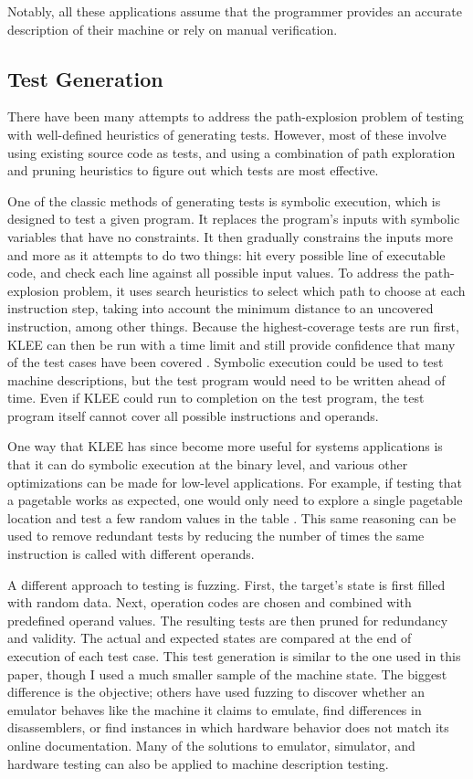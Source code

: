\documentclass[letterpaper,12pt]{article}
\begin{document}
Notably, all these applications assume that the programmer provides an accurate description of their machine or rely on manual verification.

\subsection{Test Generation}

There have been many attempts to address the path-explosion problem of testing with well-defined heuristics of generating tests. However, most of these involve using existing source code as tests, and using a combination of path exploration and pruning heuristics to figure out which tests are most effective.

One of the classic methods of generating tests is symbolic execution, which is designed to test a given program. It replaces the program's inputs with symbolic variables that have no constraints. It then gradually constrains the inputs more and more as it attempts to do two things: hit every possible line of executable code, and check each line against all possible input values. To address the path-explosion problem, it uses search heuristics to select which path to choose at each instruction step, taking into account the minimum distance to an uncovered instruction, among other things. Because the highest-coverage tests are run first, KLEE can then be run with a time limit and still provide confidence that many of the test cases have been covered \cite{Klee}. Symbolic execution could be used to test machine descriptions, but the test program would need to be written ahead of time. Even if KLEE could run to completion on the test program, the test program itself cannot cover all possible instructions and operands.

One way that KLEE has since become more useful for systems applications is that it can do symbolic execution at the binary level, and various other optimizations can be made for low-level applications. For example, if testing that a pagetable works as expected, one would only need to explore a single pagetable location and test a few random values in the table \cite{Path}. This same reasoning can be used to remove redundant tests by reducing the number of times the same instruction is called with different operands.

A different approach to testing is fuzzing. First, the target's state is first filled with random data. Next, operation codes are chosen and combined with predefined operand values. The resulting tests are then pruned for redundancy and validity. The actual and expected states are compared at the end of execution of each test case\cite{Statecmp}. This test generation is similar to the one used in this paper, though I used a much smaller sample of the machine state. The biggest difference is the objective; others have used fuzzing to discover whether an emulator behaves like the machine it claims to emulate\cite{Emu}, find differences in disassemblers\cite{Nvd}, or find instances in which hardware behavior does not match its online documentation. Many of the solutions to emulator, simulator, and hardware testing can also be applied to machine description testing.
\end{document}
